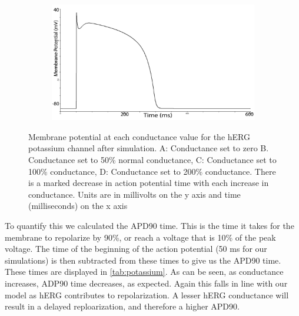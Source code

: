 \documentclass[11pt]{article}
\begin{document}
\begin{figure}[H]
\begin{subfigure}{0.45\textwidth}
		\caption{}
		\label{exp1:c}
	\end{subfigure}
	\begin{subfigure}{0.45\textwidth}
		\centering
		\includegraphics[width = \textwidth]{figs/200gkredit.png}
		\caption{}
		\label{exp1:d}
	\end{subfigure}
	\caption{Membrane potential at each conductance value for the hERG potassium channel after simulation. A: Conductance set to zero B. Conductance set to 50\% normal conductance, C: Conductance set to 100\% conductance, D: Conductance set to 200\% conductance. There is a marked decrease in action potential time with each increase in conductance. Units are in millivolts on the y axis and time (milliseconds) on the x axis}
	\label{fig:exp1}
\end{figure}
\par{}
To quantify this we calculated the APD90 time. This is the time it takes for the membrane to repolarize by 90\%, or reach a voltage that is 10\% of the peak voltage. The time of the beginning of the action potential (50 ms for our simulations) is then subtracted from these times to give us the APD90 time. These times are displayed in \ref{tab:potassium}. As can be seen, as conductance increases, ADP90 time decreases, as expected. Again this falls in line with our model as hERG contributes to repolarization. A lesser hERG conductance will result in a delayed reploarization, and therefore a higher APD90.
\end{document}
